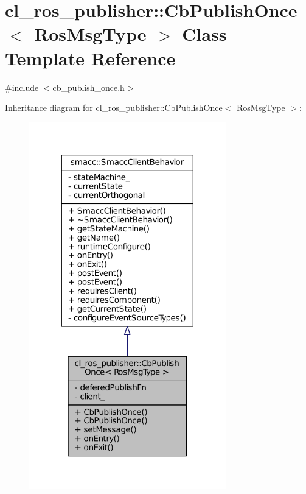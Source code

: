 \hypertarget{classcl__ros__publisher_1_1CbPublishOnce}{}\section{cl\+\_\+ros\+\_\+publisher\+:\+:Cb\+Publish\+Once$<$ Ros\+Msg\+Type $>$ Class Template Reference}
\label{classcl__ros__publisher_1_1CbPublishOnce}


{\ttfamily \#include $<$cb\+\_\+publish\+\_\+once.\+h$>$}



Inheritance diagram for cl\+\_\+ros\+\_\+publisher\+:\+:Cb\+Publish\+Once$<$ Ros\+Msg\+Type $>$\+:
\nopagebreak
\begin{figure}[H]
\begin{center}
\leavevmode
\includegraphics[width=242pt]{classcl__ros__publisher_1_1CbPublishOnce__inherit__graph}
\end{center}
\end{figure}


